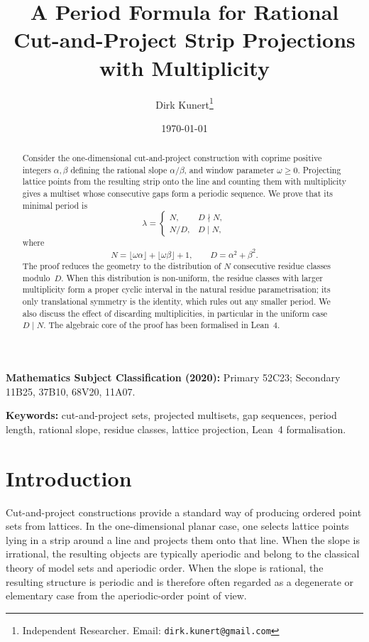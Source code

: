 \documentclass[11pt]{article}
\title{A Period Formula for Rational\\ Cut-and-Project Strip Projections\\ with Multiplicity}
\author{
    Dirk Kunert\thanks{Independent Researcher. Email: \texttt{dirk.kunert@gmail.com}}
}
\date{\today}
\theoremstyle{plain}
\theoremstyle{definition}
\theoremstyle{remark}
\begin{document}
\maketitle

\begin{abstract}
Consider the one-dimensional cut-and-project construction with coprime
positive integers \(\alpha,\beta\) defining the rational slope
\(\alpha/\beta\), and window parameter \(\omega \ge 0\).  Projecting lattice
points from the resulting strip onto the line and counting them with
multiplicity gives a multiset whose consecutive gaps form a periodic
sequence.  We prove that its minimal period is
\[
\lambda =
\begin{cases}
N, & D\nmid N,\\
N/D, & D\mid N,
\end{cases}
\]
where
\[
N=\lfloor\omega\alpha\rfloor+\lfloor\omega\beta\rfloor+1,
\qquad
D=\alpha^2+\beta^2.
\]
The proof reduces the geometry to the distribution of \(N\) consecutive
residue classes modulo~\(D\).  When this distribution is non-uniform, the
residue classes with larger multiplicity form a proper cyclic interval in
the natural residue parametrisation; its only translational symmetry is the
identity, which rules out any smaller period.  We also discuss the effect of
discarding multiplicities, in particular in the uniform case \(D\mid N\).
The algebraic core of the proof has been formalised in Lean~4.
\end{abstract}

\medskip
\noindent\textbf{Mathematics Subject Classification (2020):}
Primary 52C23; Secondary 11B25, 37B10, 68V20, 11A07.

\medskip
\noindent\textbf{Keywords:}
cut-and-project sets, projected multisets, gap sequences, period length,
rational slope, residue classes, lattice projection, Lean~4 formalisation.

\section{Introduction}\label{sec:intro}

Cut-and-project constructions provide a standard way of producing ordered
point sets from lattices.  In the one-dimensional planar case, one selects
lattice points lying in a strip around a line and projects them onto that
line.  When the slope is irrational, the resulting objects are typically
aperiodic and belong to the classical theory of model sets and aperiodic
order.  When the slope is rational, the resulting structure is periodic and
is therefore often regarded as a degenerate or elementary case from the
aperiodic-order point of view.
\end{document}
